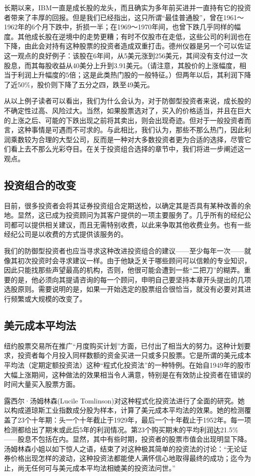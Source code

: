 \documentclass[12pt,oneside]{book}
\begin{document}
长期以来，IBM一直是成长股的龙头，而且确实为多年前买进并一直持有它的投资者带来了丰厚的回报。但是我们已经指出，这只所谓“最佳普通股”，曾在1961～1962年的6个月下跌中，折损一半；在1969～1970年间，也曾下跌几乎同样的幅度。其他成长股在逆境中的走势更糟；有时不仅股市在走低，这些公司的利润也在下降，由此会对持有这种股票的投资者造成双重打击。德州仪器是另一个可以佐证这一观点的良好例子：该股在6年间，从5美元涨到256美元，其间没有支付过一次股息，而其每股收益从40美分上升到3.91美元。（请注意，其股价的上涨幅度，相当于利润上升幅度的5倍；这是此类热门股的一般特征。）但两年以后，其利润下降了近50\%，股价则下降了五分之四，跌至49美元。

从以上例子读者可以看出，我们为什么会认为，对于防御型投资者来说，成长股的不确定性过高、风险过大。当然，如果股票选对了，买入的价格适当，并且在巨大的上涨之后、可能的下跌出现之前将其卖出，则会出现奇迹。但对于一般投资者而言，这种事情是可遇而不可求的。与此相比，我们认为，那些不那么热门，因此利润乘数较为合理的大型公司，反而是一种对大多数投资者更为合适的选择，尽管它们看上去不那么光彩夺目。在关于投资组合选择的章节中，我们将进一步阐述这一观点。

\subsection{投资组合的改变}
目前，很多投资者会将其证券投资组合定期送检，以确定其是否具有某种改善的余地。显然，这已成为投资顾问为其客户提供的一项主要服务了。几乎所有的经纪公司都可以提供相关建议，而且无需特别收费，以此来争取其他收费业务。也有一些经纪公司是以收费的方式提供该服务的。

我们的防御型投资者也应当寻求这种改进投资组合的建议——至少每年一次——就像其初次投资时会寻求建议一样。由于他缺乏关于哪些顾问可以信赖的专业知识，因此只能找那些声望最高的机构，否则，他很可能会遭到一些“二把刀”的糊弄。重要的是，他必须向其提请咨询的每一个顾问，申明自己要坚持本章开头提出的几项选股原则。需要说明的是，如果一开始选定的股票组合很恰当，就没有必要对其进行频繁或大规模的改变了。

\subsection{美元成本平均法}
纽约股票交易所在推广“月度购买计划”方面，已付出了相当大的努力。这种计划要求，投资者每个月投入同样数额的资金买进一只或多只股票。它是所谓的美元成本平均法（定期定额投资法）这种“程式化投资法”的一种特例。在始自1949年的股市大幅上涨期间，这种做法的效果相当令人满意，特别是在有效防止投资者在错误的时间大量买入股票方面。

露西尔·汤姆林森(Lucile Tomlinson)对这种程式化投资法进行了全面的研究。她以构成道琼斯工业指数成分股为样本，计算了美元成本平均法的效果。她的检测覆盖了23个十年期：头一个十年截止于1929年，最后一个十年截止于1952年。每一项检测都给出了期末或此后5年的利润情况。第23个购买期末的平均利润达21.5\%——股息不包括在内。显然，其中有些时期，投资者的股票市值会出现明显下降。汤姆林森小姐以如下惊人之语，结束了对这种极其简单的投资法的讨论：“无论证券价格出现怎样的波动，这种投资法都能使人满怀信心地取得最终的成功；迄今为止，尚无任何可与美元成本平均法相媲美的投资法问世。”
\end{document}
